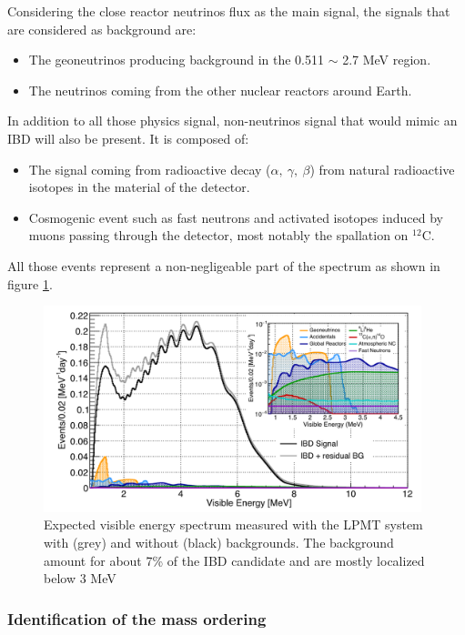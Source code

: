 \documentclass[../main.tex]{subfiles}
\begin{document}
Considering the close reactor neutrinos flux as the main signal, the signals that are considered as background are:
\begin{itemize}
  \item The geoneutrinos producing background in the 0.511 $\sim$ 2.7 MeV region.
  \item The neutrinos coming from the other nuclear reactors around Earth.
\end{itemize}
In addition to all those physics signal, non-neutrinos signal that would mimic an IBD will also be present. It is composed of:
\begin{itemize}
  \item The signal coming from radioactive decay ($\alpha, ~ \gamma, ~ \beta$) from natural radioactive isotopes in the material of the detector.
  \item Cosmogenic event such as fast neutrons and activated isotopes induced by muons passing through the detector, most notably the spallation on $^{12}$C.
\end{itemize}
All those events represent a non-negligeable part of the spectrum as shown in figure \ref{fig:juno:spectrum_with_background}.

\begin{figure}[ht]
  \centering
  \includegraphics[height=6cm]{images/juno/spectrum_with_background.png}
  \caption{Expected visible energy spectrum measured with the LPMT system with (grey) and without (black) backgrounds. The background amount for about 7\% of the IBD candidate and are mostly localized below 3 MeV \cite{juno_collaboration_sub-percent_2022}}
  \label{fig:juno:spectrum_with_background}
\end{figure}


\subsubsection{Identification of the mass ordering}
\end{document}
